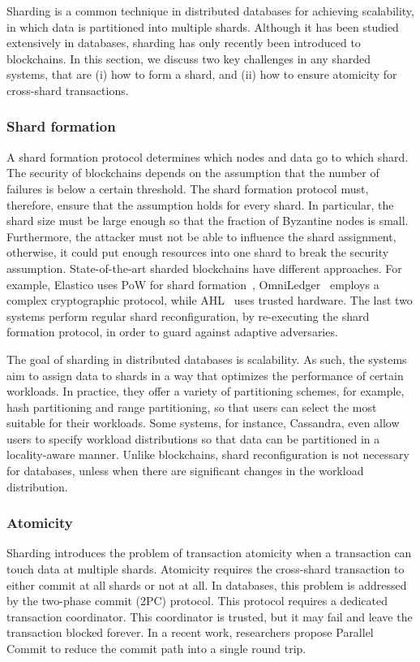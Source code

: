 Sharding is a common technique in distributed databases for achieving scalability, in which data is
partitioned into multiple shards. Although it has been studied extensively
in databases, sharding has only recently been introduced to blockchains. In this section, we discuss two key
challenges in any sharded systems, that are (i) how to form a shard, and (ii) how to ensure atomicity for cross-shard
transactions.  

\subsubsection{Shard formation}
A shard formation protocol determines which nodes and data go to which shard. 
The security of blockchains depends on the assumption that the number of failures is below a certain
threshold. The shard formation protocol must, therefore, ensure that the assumption holds for every shard.  In
particular, the shard size must be large enough so that the fraction of Byzantine nodes is small.
Furthermore, the attacker must not be able to influence the shard assignment, otherwise, it could put enough
resources into one shard to break the security assumption. State-of-the-art sharded blockchains have different
approaches. For example, Elastico uses PoW for shard formation~\cite{luu2016secure},
OmniLedger~\cite{kokoris2018omniledger} employs a complex cryptographic protocol, while
AHL~\cite{dang2019towards} uses trusted hardware. The last two systems perform regular shard reconfiguration,
by re-executing the shard formation protocol, in order to guard against adaptive adversaries. 

The goal of sharding in distributed databases is scalability. As such, the systems aim to assign
data to shards in a way that optimizes the performance of certain workloads. In practice, they offer a variety of partitioning
schemes, for example, hash partitioning and range partitioning, so that users can select the most suitable
for their workloads.  Some systems, for instance, Cassandra\cite{lakshman2010cassandra}, even allow users to specify workload distributions so that data can be partitioned in a locality-aware manner. Unlike blockchains, shard reconfiguration is not necessary for databases, unless when there are significant changes in the workload distribution. 

\subsubsection{Atomicity}
Sharding introduces the problem of transaction atomicity when a transaction can touch data at multiple shards.
Atomicity requires the cross-shard transaction to either commit at all shards or not at all. In databases, this problem
is addressed by the two-phase commit (2PC) protocol. This protocol requires a dedicated transaction coordinator. This coordinator is trusted, but it may fail and leave
the transaction blocked forever. 
In a recent work, researchers propose Parallel Commit to reduce the commit path into a single round trip\cite{taft2020cockroachdb}. 


